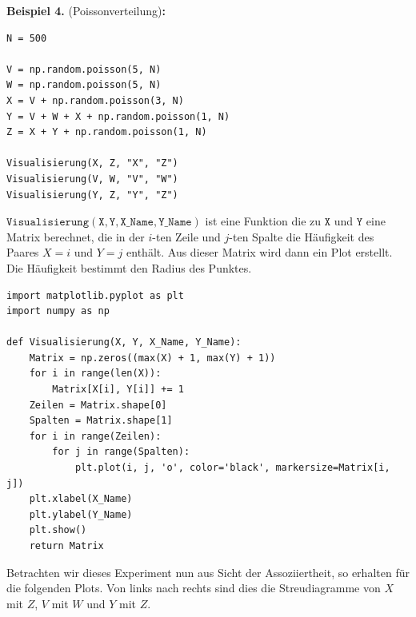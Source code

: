 \documentclass[headsepline,11pt,bibliography=leveldown]{scrbook}
\newcounter{NewZaehler}
\newcommand{\NewZahl}{\refstepcounter{NewZaehler}4.\theNewZaehler}
\newenvironment{NewBeispiel}[1]{\par\medskip\textbf{Beispiel \NewZahl} #1\textbf{:}\\}{\par\medskip}
\begin{document}
\begin{NewBeispiel}{(Poissonverteilung)}
\begin{lstlisting}
N = 500

V = np.random.poisson(5, N)
W = np.random.poisson(5, N)
X = V + np.random.poisson(3, N)
Y = V + W + X + np.random.poisson(1, N)
Z = X + Y + np.random.poisson(1, N)

Visualisierung(X, Z, "X", "Z")
Visualisierung(V, W, "V", "W")
Visualisierung(Y, Z, "Y", "Z")
\end{lstlisting}

$\mathtt{Visualisierung(X, Y, X\_Name, Y\_Name)}$ ist eine Funktion die zu $\mathtt{X}$ und $\mathtt{Y}$ eine Matrix berechnet, die in der $i$-ten Zeile und $j$-ten Spalte die Häufigkeit des Paares $X = i$ und $Y = j$ enthält. Aus dieser Matrix wird dann ein Plot erstellt. Die Häufigkeit bestimmt den Radius des Punktes.
\begin{lstlisting}
import matplotlib.pyplot as plt
import numpy as np

def Visualisierung(X, Y, X_Name, Y_Name):
    Matrix = np.zeros((max(X) + 1, max(Y) + 1))
    for i in range(len(X)):
        Matrix[X[i], Y[i]] += 1
    Zeilen = Matrix.shape[0]
    Spalten = Matrix.shape[1]
    for i in range(Zeilen):
        for j in range(Spalten):
            plt.plot(i, j, 'o', color='black', markersize=Matrix[i, j])
    plt.xlabel(X_Name)
    plt.ylabel(Y_Name)
    plt.show()
    return Matrix
\end{lstlisting}

Betrachten wir dieses Experiment nun aus Sicht der Assoziiertheit, so erhalten für die folgenden Plots. Von links nach rechts sind dies die Streudiagramme von $X$ mit $Z$, $V$ mit $W$ und $Y$ mit $Z$.\\


\end{NewBeispiel}
\end{document}

